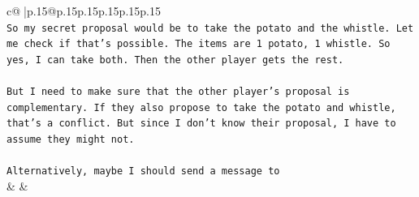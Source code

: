 \documentclass{article}
\begin{document}
{\begin{supertabular}{c@{$\;$}|p{.15\linewidth}@{}p{.15\linewidth}p{.15\linewidth}p{.15\linewidth}p{.15\linewidth}p{.15\linewidth}}
{{{\\ 
\texttt{So my secret proposal would be to take the potato and the whistle. Let me check if that's possible. The items are 1 potato, 1 whistle. So yes, I can take both. Then the other player gets the rest. } \\
\\ 
\texttt{But I need to make sure that the other player's proposal is complementary. If they also propose to take the potato and whistle, that's a conflict. But since I don't know their proposal, I have to assume they might not. } \\
\\ 
\texttt{Alternatively, maybe I should send a message to} \\
            }
        }
    }
    & & \\ \\


\end{supertabular}}
\end{document}
